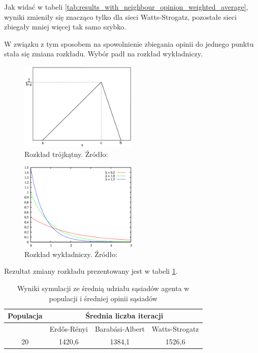 Jak widać w tabeli \ref{tab:results_with_neighbour_opinion_weighted_average}, wyniki zmieniły się znacząco tylko dla sieci Watts-Strogatz,
pozostałe sieci zbiegały mniej więcej tak samo szybko.

W związku z tym sposobem na spowolnienie zbiegania opinii do jednego punktu stała się zmiana rozkładu.
Wybór padł na rozkład wykładniczy.

\begin{figure}
    \centering
    \includegraphics[width=0.5\textwidth]{img/Triangular_distribution_PMF.png}
    \caption{Rozkład trójkątny. Źródło: \cite{rozklad_trojkatny_wykres}}
    \label{fig:rozklad_trojkatny}
\end{figure}
\begin{figure}
    \centering
    \includegraphics[width=0.5\textwidth]{img/Exponential_distribution_pdf.png}
    \caption{Rozkład wykładniczy. Źródło: \cite{rozklad_wykladniczy_wykres}}
    \label{fig:rozklad_wykladniczy}
\end{figure}

Rezultat zmiany rozkładu prezentowany jest w tabeli \ref{tab:results_with_exponential_distribution}.

\begin{table}[htbp]
    \centering
    \begin{tabular}{c|c|c|c}
        \hline
        Populacja & \multicolumn{3}{c}{Średnia liczba iteracji}                                    \\
        \hline
                  & Erdős-Rényi                                 & Barabási-Albert & Watts-Strogatz \\
        \hline
        20        & 1420,6                                      & 1384,1          & 1526,6         \\
    \end{tabular}
    \caption{Wyniki symulacji ze średnią udziału sąsiadów agenta w populacji i średniej opinii sąsiadów}
    \label{tab:results_with_exponential_distribution}
\end{table}

